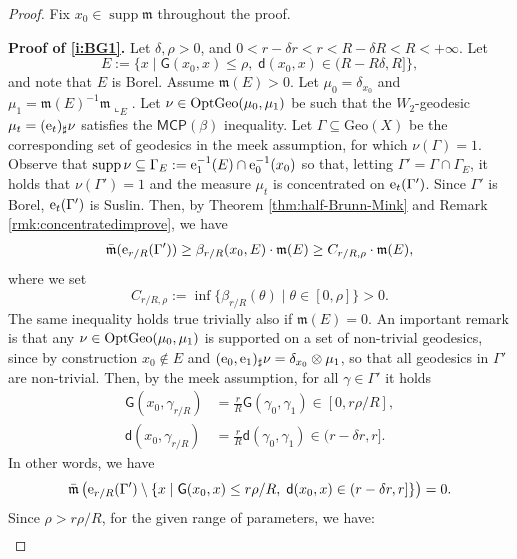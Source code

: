 \documentclass[11pt,a4paper]{article}
\theoremstyle{plain}
\theoremstyle{definition}
\theoremstyle{remark}
\numberwithin{equation}{section}
\DeclareMathOperator{\supp}{\mathrm{supp}}
\newcommand{\Geo}{\mathrm{Geo}}
\newcommand{\MCP}{\mathsf{MCP}}
\newcommand{\OptGeo}{{\rm OptGeo}}
\newcommand{\mm}{\mathfrak m}
\newcommand{\ee}{{\rm e}}
\newcommand{\sfd}{\mathsf d}
\newcommand{\sfG}{\mathsf G}
\begin{document}
\begin{proof} Fix $x_0\in\supp\mm$ throughout the proof.

\textbf{Proof of \ref{i:BG1}.} Let $\delta,\rho>0$, and $0<r-\delta r<r<R-\delta R<R<+\infty$. Let
\begin{equation}
E:=\{ x\mid \sfG(x_0,x) \leq \rho, \;\sfd(x_0,x) \in (R-R\delta, R]  \},
\end{equation}
and note that $E$ is Borel. Assume $\mm(E)>0$. Let $\mu_0=\delta_{x_0}$ and $\mu_1 = \mm(E)^{-1}\mm\llcorner_{E}$. Let $\nu\in \OptGeo(\mu_0,\mu_1)$ be such that the $W_2$-geodesic $\mu_t = (\ee_t)_\sharp \nu$ satisfies the $\MCP(\beta)$ inequality. Let $\Gamma\subseteq \Geo(X)$ be the corresponding set of geodesics in the meek assumption, for which $\nu(\Gamma)=1$. Observe that $\supp\nu \subseteq \Gamma_E:= \ee_1^{-1}(E)\cap \ee_0^{-1}(x_0)$ so that, letting $\Gamma'= \Gamma\cap \Gamma_E$, it holds that $\nu(\Gamma')=1$ and the measure $\mu_t$ is concentrated on $\ee_t(\Gamma')$. Since $\Gamma'$ is Borel, $\ee_t(\Gamma')$ is Suslin. Then, by Theorem \ref{thm:half-Brunn-Mink} and Remark \ref{rmk:concentratedimprove}, we have
\begin{align}
\bar{\mm}(\ee_{r/R}(\Gamma'))  \geq \beta_{r/R}(x_0,E) \cdot \mm(E) \geq C_{r/R,\rho} \cdot \mm(E),
\end{align}
where we set
\begin{equation}
C_{r/R,\rho}:=\inf\{\beta_{r/R}(\theta)\mid \theta \in [0,\rho]\}>0.
\end{equation}
The same inequality holds true trivially also if $\mm(E)=0$. An important remark is that any $\nu \in \OptGeo(\mu_0,\mu_1)$ is supported on a set of non-trivial geodesics, since by construction $x_0\notin E$ and $(\ee_0,\ee_1)_\sharp \nu = \delta_{x_0}\otimes \mu_1$, so that all geodesics in $\Gamma'$ are non-trivial. Then,  by the meek assumption, for all $\gamma \in \Gamma'$ it holds
\begin{align}
\sfG(x_0,\gamma_{r/R}) & = \frac{r}{R}\sfG(\gamma_0,\gamma_1) \in [0,r\rho/R], \\
\sfd(x_0,\gamma_{r/R}) & = \frac{r}{R}\sfd(\gamma_0,\gamma_1) \in (r-\delta r,r].
\end{align}
In other words, we have
\begin{equation}
\bar{\mm}\left(\ee_{r/R}(\Gamma') \setminus \{x \mid \sfG(x_0,x) \leq r\rho/R,\; \sfd(x_0,x) \in (r- \delta r,r] \}\right)=0.
\end{equation}
Since $\rho > r\rho/R$, for the given range of parameters, we have:
\begin{multline}\label{eq:multi0}

\end{multline}
\end{proof}
\end{document}
